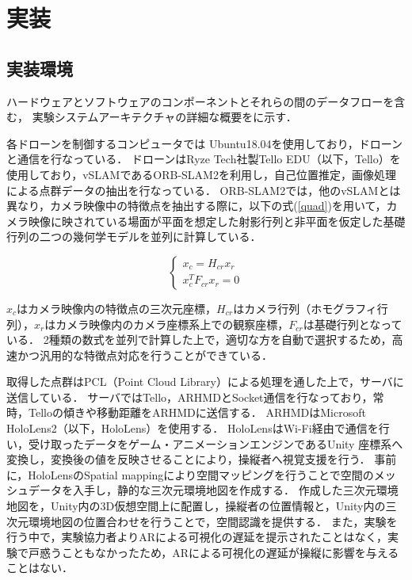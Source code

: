 \documentclass[a4paper,11pt]{ujreport}
\begin{document}
\chapter{実装}
\label{chap:Development}


\section{実装環境}
\label{sec:DevEnviroment}

ハードウェアとソフトウェアのコンポーネントとそれらの間のデータフローを含む，
実験システムアーキテクチャの詳細な概要をに示す．

各ドローンを制御するコンピュータでは Ubuntu18.04を使用しており，ドローンと通信を行なっている．
ドローンはRyze Tech社製Tello EDU（以下，Tello）\cite{web-tello}を使用しており，vSLAMであるORB-SLAM2\cite{article-slam}を利用し，自己位置推定，画像処理による点群データの抽出を行なっている．
ORB-SLAM2では，他のvSLAMとは異なり，カメラ映像中の特徴点を抽出する際に，以下の式(\ref{quad})を用いて，カメラ映像に映されている場面が平面を想定した射影行列と非平面を仮定した基礎行列の二つの幾何学モデルを並列に計算している．

\begin{equation}
  \label{quad}
  \left\{
    \begin{aligned}
    x_{c}=H_{cr}x_{r}\\
    x^{T}_{c}F_{cr}x_{r}=0
  \end{aligned}
  \right.
\end{equation}

$x_{c}$はカメラ映像内の特徴点の三次元座標，$H_{cr}$はカメラ行列（ホモグラフィ行列），$x_{r}$はカメラ映像内のカメラ座標系上での観察座標，$F_{cr}$は基礎行列となっている．
2種類の数式を並列で計算した上で，適切な方を自動で選択するため，高速かつ汎用的な特徴点対応を行うことができている．

取得した点群はPCL（Point Cloud Library）\cite{book-pcl}による処理を通した上で，サーバに送信している．
サーバではTello，ARHMDとSocket通信を行なっており，常時，Telloの傾きや移動距離をARHMDに送信する．
ARHMDはMicrosoft HoloLens2（以下，HoloLens）\cite{web-hololens}を使用する．
HoloLensはWi-Fi経由で通信を行い，受け取ったデータをゲーム・アニメーションエンジンであるUnity \cite{web-unity}座標系へ変換し，変換後の値を反映させることにより，操縦者へ視覚支援を行う．
事前に，HoloLensのSpatial mapping\cite{web-spatial}により空間マッピングを行うことで空間のメッシュデータを入手し，静的な三次元環境地図を作成する．
作成した三次元環境地図を，Unity内の3D仮想空間上に配置し，操縦者の位置情報と，Unity内の三次元環境地図の位置合わせを行うことで，空間認識を提供する．
また，実験を行う中で，実験協力者よりARによる可視化の遅延を提示されたことはなく，実験で戸惑うこともなかったため，ARによる可視化の遅延が操縦に影響を与えることはない．
\end{document}
